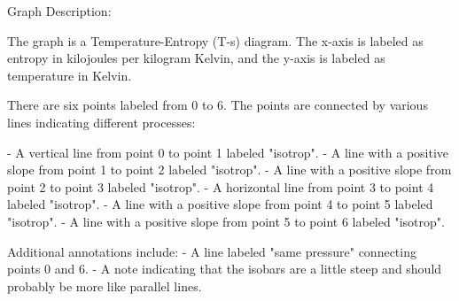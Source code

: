Graph Description:

The graph is a Temperature-Entropy (T-s) diagram. The x-axis is labeled as entropy in kilojoules per kilogram Kelvin, and the y-axis is labeled as temperature in Kelvin.

There are six points labeled from 0 to 6. The points are connected by various lines indicating different processes:

- A vertical line from point 0 to point 1 labeled "isotrop".
- A line with a positive slope from point 1 to point 2 labeled "isotrop".
- A line with a positive slope from point 2 to point 3 labeled "isotrop".
- A horizontal line from point 3 to point 4 labeled "isotrop".
- A line with a positive slope from point 4 to point 5 labeled "isotrop".
- A line with a positive slope from point 5 to point 6 labeled "isotrop".

Additional annotations include:
- A line labeled "same pressure" connecting points 0 and 6.
- A note indicating that the isobars are a little steep and should probably be more like parallel lines.
